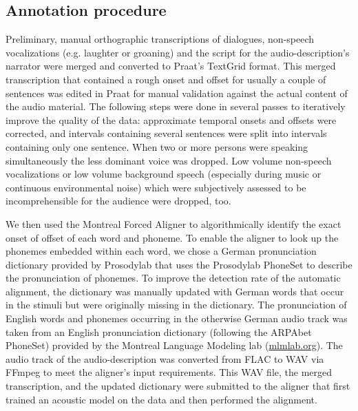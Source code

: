 \documentclass[10pt,a4paper,onecolumn]{article}
\begin{document}
\subsection*{Annotation procedure}
Preliminary, manual orthographic transcriptions of dialogues, non-speech
vocalizations (e.g. laughter or groaning) and the script for the
audio-description's narrator were merged and converted to Praat's
\citep{boersma2019praat} TextGrid format.
This merged transcription that contained a rough onset and offset for usually a
couple of sentences was edited in Praat for manual validation against the actual
content of the audio material.
The following steps were done in several passes to iteratively improve the
quality of the data: approximate temporal onsets and offsets were corrected, and
intervals containing several sentences were split into intervals containing only
one sentence.
When two or more persons were speaking simultaneously the less dominant voice
was dropped. Low volume non-speech vocalizations or low volume background speech
(especially during music or continuous environmental noise) which were
subjectively assessed to be incomprehensible for the audience were dropped, too.

We then used the Montreal Forced Aligner \citep{mcauliffe2017montreal} to
algorithmically identify the exact onset of offset of each word and phoneme.
To enable the aligner to look up the phonemes embedded within each word, we
chose a German pronunciation dictionary provided by Prosodylab \citep
{gorman2011prosodylab} that uses the Prosodylab PhoneSet to describe the
pronunciation of phonemes.
To improve the detection rate of the automatic alignment, the dictionary was
manually updated with German words that occur in the stimuli but were originally
missing in the dictionary.
The pronunciation of English words and phonemes occurring in the otherwise
German audio track was taken from an English pronunciation dictionary (following
the ARPAbet PhoneSet) provided by the Montreal Language Modeling lab
(\href{http://mlmlab.org/mfa/dictionaries/english.dict}{mlmlab.org}).
The audio track of the audio-description was converted from FLAC to WAV via
FFmpeg \citep{ffmpeg} to meet the aligner's input requirements.
This WAV file, the merged transcription, and the updated dictionary were
submitted to the aligner that first trained an acoustic model on the data and
then performed the alignment.
\end{document}
